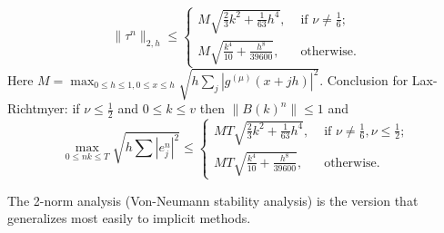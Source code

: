 \[
    \|\tau^n \|_{2,h} \le \begin{cases}
        M \sqrt{\frac{2}{3}k^2 + \frac{1}{63}h^4} , &\text{ if } \nu \neq \frac{1}{6} ;\\
        M\sqrt{\frac{k^4}{10}+\frac{h^8}{39600}} , &\text{ otherwise} .
    \end{cases}
\]
Here $M = \max_{0\le h\le 1, 0\le x \le h} \sqrt{h \sum_j |g^{(\mu)} (x+jh)|^2}$.  Conclusion for Lax-Richtmyer: if $\nu\le \frac{1}{2}$ and $0\le k\le v$ then $\|B(k)^n\|\le 1$ and 
\[
    \max_{0\le nk \le T} \sqrt{h\sum |e_j^n|^2} \le \begin{cases}
        MT\sqrt{\frac{2}{3}k^2 + \frac{1}{63}h^4} , &\text{ if } \nu \neq \frac{1}{6}, \nu\le \frac{1}{2} ;\\
        MT\sqrt{\frac{k^4}{10} + \frac{h^8}{39600}} , &\text{ otherwise} .
    \end{cases}
\]


\begin{note}
The 2-norm analysis (Von-Neumann stability analysis) is the version that generalizes most easily to implicit methods. 
\end{note}
